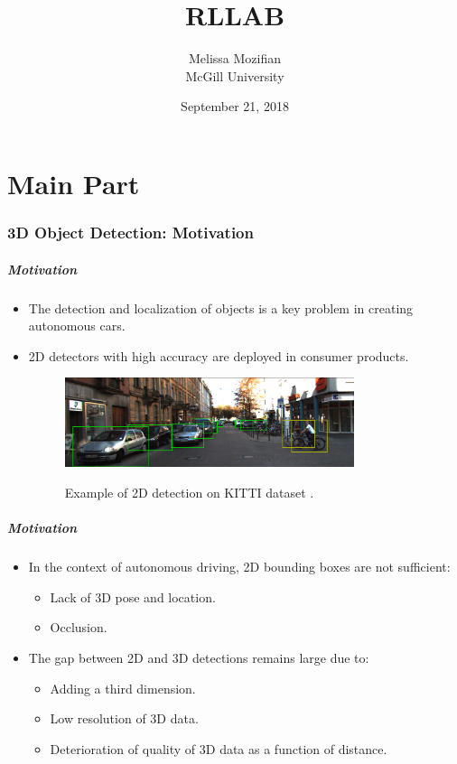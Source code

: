 \documentclass[10pt,fleqn,unknownkeysallowed]{beamer}
\author[M. Mozifian]{Melissa Mozifian\\[5pt]\scriptsize{McGill University}}
\title{RLLAB}
\institute{\small{Real-time 3D Object Detection for Autonomous Driving }}
\date[21/9/2018]{September 21, 2018}
\begin{document}
\frame[plain]{\titlepage}

\part{Main Part}
	
\section{3D Object Detection: Motivation}
\begin{frame}
	\frametitle{Motivation}
	  \begin{itemize}
	  	\item{The detection and localization of objects is a key problem in creating autonomous cars.}
	  	\item{2D detectors with high accuracy are deployed in consumer products.}
  		\begin{figure}
  			\begin{center}
  				\includegraphics[width=0.8\textwidth]{images/detection_2d}\\
  				\caption{Example of 2D detection on KITTI dataset \cite{kitti}.}
  			\end{center}
  		\end{figure}
	  \end{itemize}
\end{frame}

\begin{frame}
	\frametitle{Motivation}
	\linespread{1.5}
	\begin{itemize}
		\item{In the context of autonomous driving, 2D bounding boxes are not sufficient:}
		\begin{itemize}
			\item{Lack of 3D pose and location.}
			\item{Occlusion.}
		\end{itemize}
		\item{The gap between 2D and 3D detections remains large due to:}
		\begin{itemize}
			\item{Adding a third dimension.}
			\item{Low resolution of 3D data.}
			\item {Deterioration of quality of 3D data as a function of distance.}
		\end{itemize}
	\end{itemize}
\end{frame}
\end{document}
